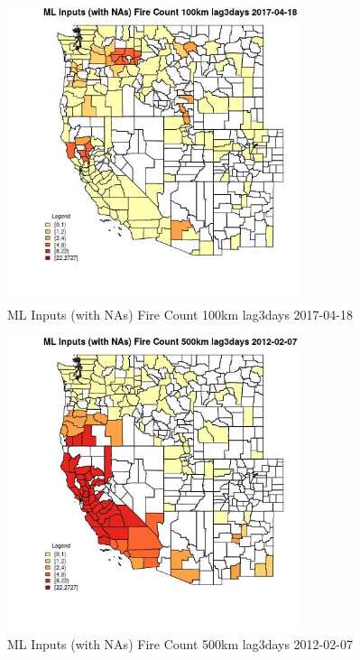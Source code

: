 \begin{figure} 
\centering  
\includegraphics[width=0.77\textwidth]{Code_Outputs/Report_ML_input_PM25_Step4_part_f_de_duplicated_aves_prioritize_24hr_obswNAs_CountyFire_Count_100km_lag3daysMean2017-04-18.jpg} 
\caption{\label{fig:Report_ML_input_PM25_Step4_part_f_de_duplicated_aves_prioritize_24hr_obswNAsCountyFire_Count_100km_lag3daysMean2017-04-18}ML Inputs (with NAs) Fire Count 100km lag3days 2017-04-18} 
\end{figure} 
 

\clearpage 

\begin{figure} 
\centering  
\includegraphics[width=0.77\textwidth]{Code_Outputs/Report_ML_input_PM25_Step4_part_f_de_duplicated_aves_prioritize_24hr_obswNAs_CountyFire_Count_500km_lag3daysMean2012-02-07.jpg} 
\caption{\label{fig:Report_ML_input_PM25_Step4_part_f_de_duplicated_aves_prioritize_24hr_obswNAsCountyFire_Count_500km_lag3daysMean2012-02-07}ML Inputs (with NAs) Fire Count 500km lag3days 2012-02-07} 
\end{figure} 
 

